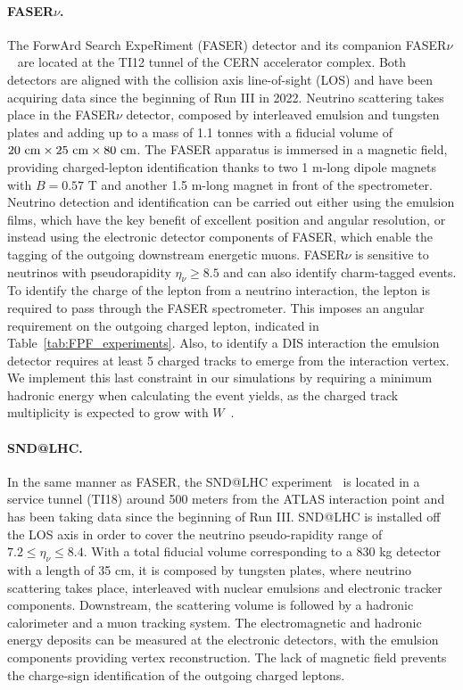 \paragraph{FASER$\nu$.}
%
The ForwArd Search ExpeRiment (FASER) detector
and its companion FASER$\nu$~\cite{FASER:2019aik,FASER:2019dxq,FASER:2023zcr,FASER:2022hcn}
are located at the TI12 tunnel of the CERN accelerator complex.
%
Both detectors are aligned
with the collision axis line-of-sight (LOS)
and have been acquiring data since the beginning of Run III in 2022.
%
Neutrino scattering takes place in the FASER$\nu$ 
detector, composed by interleaved emulsion and tungsten plates and
adding up to a mass of 1.1 tonnes with a fiducial volume of $20~\rm{cm} \times 25~\rm{cm} \times 80~{\rm cm}$.
%
The FASER apparatus is immersed in a magnetic field,  providing charged-lepton
identification thanks to two 1 m-long dipole magnets with $B=0.57$ T
and another 1.5 m-long magnet in front of the spectrometer. 
%
Neutrino detection and identification can be carried out either using the emulsion
films, which have the key benefit of excellent position and angular resolution,
or instead using the electronic detector components of FASER, which enable the tagging
of the outgoing downstream energetic muons.
%
FASER$\nu$ is sensitive to neutrinos with pseudorapidity $\eta_\nu \ge 8.5$
and can also identify charm-tagged events.
%
To identify the charge of the lepton from a neutrino interaction, the lepton is required to pass through the FASER spectrometer.
%
This imposes an angular requirement on the outgoing charged lepton, indicated
in Table~\ref{tab:FPF_experiments}.
%
Also, to identify a DIS interaction the emulsion detector requires at least 5 charged tracks
to emerge from the interaction vertex.
%
We implement this last constraint
in our simulations by requiring a minimum hadronic energy when calculating the event yields, as the charged track multiplicity is expected to grow with $W$~\cite{Aachen-Bonn-CERN-Munich-Oxford:1981lfk,FASER:2019dxq}. 

\paragraph{SND@LHC.}
%
In the same manner as FASER, the SND@LHC experiment~\cite{SNDLHC:2022ihg}
is located in a service tunnel (TI18)
around 500 meters from the ATLAS interaction point and has been taking data
since the  beginning of Run III.
%
SND@LHC is installed off the LOS axis in order to cover the neutrino
pseudo-rapidity range of $7.2 \le \eta_\nu \le 8.4$.
%
With a total fiducial volume corresponding to a 830 kg detector with a length of 35 cm, it is composed by tungsten plates,
where neutrino scattering takes place, interleaved with nuclear emulsions and electronic tracker
components.
%
Downstream, the scattering volume is followed by a hadronic calorimeter and a muon tracking system.
%
The electromagnetic
 and hadronic energy deposits can be measured at the electronic detectors, with the emulsion
 components providing vertex reconstruction.
 The lack of magnetic field prevents the charge-sign identification of the outgoing charged leptons.

